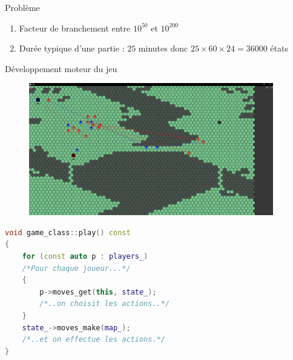 \documentclass[french]{beamer}
\begin{document}
\begin{frame}{Problème}
	\begin{enumerate}
		\item Facteur de branchement entre $10^{50}$ et $10^{200}$
		\item Durée typique d'une partie : $25$ minutes donc $25\times60\times24=36000$ états
	\end{enumerate}
\end{frame}
\begin{frame}{Développement moteur du jeu}
	\begin{figure}
		\centering
		\begin{minipage}{0.49\textwidth}
			\centering
			
		\end{minipage}\hfill
		\begin{minipage}{0.49\textwidth}
			\centering
			\includegraphics[width=0.95\textwidth]{screen_carte_pleine.png}
		\end{minipage}
	\end{figure}
\end{frame}
\begin{frame}[fragile]
	\small
	\begin{lstlisting}[language=C++,basicstyle=\ttfamily,keywordstyle=\color{red}]
void game_class::play() const
{
    for (const auto p : players_)
    /*Pour chaque joueur...*/
    {
        p->moves_get(this, state_);
        /*..on choisit les actions..*/
    }
    state_->moves_make(map_);
    /*..et on effectue les actions.*/
}
	\end{lstlisting}
\end{frame}
\end{document}
